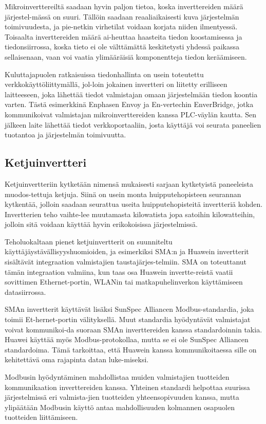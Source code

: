   Mikroinverttereiltä saadaan hyvin paljon tietoa, koska inverttereiden määrä järjestel-mässä on suuri. Tällöin saadaan reaaliaikaisesti kuva järjestelmän toimivuudesta, ja pie-netkin virhetilat voidaan korjata niiden ilmentyessä. Toisaalta inverttereiden määrä ai-heuttaa haasteita tiedon koostamisessa ja tiedonsiirrossa, koska tieto ei ole välttämättä keskitetysti yhdessä paikassa sellaisenaan, vaan voi vaatia ylimääräisiä komponentteja tiedon keräämiseen.

  Kuluttajapuolen ratkaisuissa tiedonhallinta on usein toteutettu verkkokäyttöliittymällä, jol-loin jokainen invertteri on liitetty erilliseen laitteeseen, joka lähettää tiedot valmistajan omaan järjestelmään tiedon koontia varten. Tästä esimerkkinä Enphasen Envoy ja En-vertechin EnverBridge, jotka kommunikoivat valmistajan mikroinverttereiden kanssa PLC-väylän kautta. Sen jälkeen laite lähettää tiedot verkkoportaaliin, josta käyttäjä voi seurata paneelien tuotantoa ja järjestelmän toimivuutta.

\subsection{Ketjuinvertteri}
  Ketjuinvertteriin kytketään nimensä mukaisesti sarjaan kytketyistä paneeleista muodos-tettuja ketjuja. Siinä on usein monta huipputehopisteen seurannan kytkentää, jolloin saadaan seurattua useita huipputehopisteitä invertteriä kohden. Invertterien teho vaihte-lee muutamasta kilowatista jopa satoihin kilowatteihin, jolloin sitä voidaan käyttää hyvin erikokoisissa järjestelmissä. 

  Teholuokaltaan pienet ketjuinvertterit on suunniteltu käyttäjäystävällisyyshuomioiden, ja esimerkiksi SMA:n ja Huawein invertterit sisältävät integraation valmistajien taustajärjes-telmiin. SMA on toteuttanut tämän integraation valmiina, kun taas osa Huawein invertte-reistä vaatii sovittimen Ethernet-portin, WLANin tai matkapuhelinverkon käyttämiseen datasiirrossa.

  SMAn invertterit käyttävät lisäksi SunSpec Alliancen Modbus-standardia, joka toimii Et-hernet-portin välityksellä. Muut standardia hyödyntävät valmistajat voivat kommunikoi-da suoraan SMAn inverttereiden kanssa standardoinnin takia. Huawei käyttää myös Modbus-protokollaa, mutta se ei ole SunSpec Alliancen standardoima. Tämä tarkoittaa, että Huawein kanssa kommunikoitaessa sille on kehitettävä oma rajapinta datan luke-miseksi.

  Modbusin hyödyntäminen mahdollistaa muiden valmistajien tuotteiden kommunikaation inverttereiden kanssa. Yhteinen standardi helpottaa suurissa järjestelmissä eri valmista-jien tuotteiden yhteensopivuuden kanssa, mutta ylipäätään Modbusin käyttö antaa mahdollisuuden kolmannen osapuolen tuotteiden liittämiseen. 

